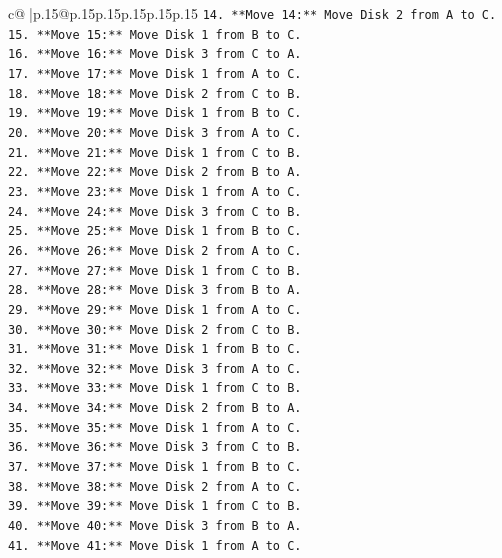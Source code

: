 \documentclass{article}
\begin{document}
{\begin{supertabular}{c@{$\;$}|p{.15\linewidth}@{}p{.15\linewidth}p{.15\linewidth}p{.15\linewidth}p{.15\linewidth}p{.15\linewidth}}
{{{\texttt{14. **Move 14:** Move Disk 2 from A to C.} \\
\texttt{15. **Move 15:** Move Disk 1 from B to C.} \\
\texttt{16. **Move 16:** Move Disk 3 from C to A.} \\
\texttt{17. **Move 17:** Move Disk 1 from A to C.} \\
\texttt{18. **Move 18:** Move Disk 2 from C to B.} \\
\texttt{19. **Move 19:** Move Disk 1 from B to C.} \\
\texttt{20. **Move 20:** Move Disk 3 from A to C.} \\
\texttt{21. **Move 21:** Move Disk 1 from C to B.} \\
\texttt{22. **Move 22:** Move Disk 2 from B to A.} \\
\texttt{23. **Move 23:** Move Disk 1 from A to C.} \\
\texttt{24. **Move 24:** Move Disk 3 from C to B.} \\
\texttt{25. **Move 25:** Move Disk 1 from B to C.} \\
\texttt{26. **Move 26:** Move Disk 2 from A to C.} \\
\texttt{27. **Move 27:** Move Disk 1 from C to B.} \\
\texttt{28. **Move 28:** Move Disk 3 from B to A.} \\
\texttt{29. **Move 29:** Move Disk 1 from A to C.} \\
\texttt{30. **Move 30:** Move Disk 2 from C to B.} \\
\texttt{31. **Move 31:** Move Disk 1 from B to C.} \\
\texttt{32. **Move 32:** Move Disk 3 from A to C.} \\
\texttt{33. **Move 33:** Move Disk 1 from C to B.} \\
\texttt{34. **Move 34:** Move Disk 2 from B to A.} \\
\texttt{35. **Move 35:** Move Disk 1 from A to C.} \\
\texttt{36. **Move 36:** Move Disk 3 from C to B.} \\
\texttt{37. **Move 37:** Move Disk 1 from B to C.} \\
\texttt{38. **Move 38:** Move Disk 2 from A to C.} \\
\texttt{39. **Move 39:** Move Disk 1 from C to B.} \\
\texttt{40. **Move 40:** Move Disk 3 from B to A.} \\
\texttt{41. **Move 41:** Move Disk 1 from A to C.} \\
}}}
\end{supertabular}}
\end{document}
